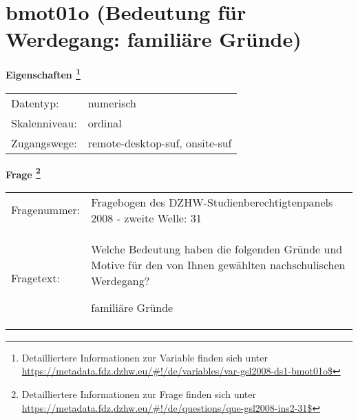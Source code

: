 
    \setcounter{footnote}{0}

    \vspace*{-1.8cm}
	\section{bmot01o (Bedeutung für Werdegang: familiäre Gründe)}
	\label{section:bmot01o}



    \vspace*{0.5cm}
    \noindent\textbf{Eigenschaften
	\footnote{Detailliertere Informationen zur Variable finden sich unter
		\url{https://metadata.fdz.dzhw.eu/\#!/de/variables/var-gsl2008-ds1-bmot01o$}}}\\
	\begin{tabularx}{\hsize}{@{}lX}
	Datentyp: & numerisch \\
	Skalenniveau: & ordinal \\
	Zugangswege: &
	  remote-desktop-suf, 
	  onsite-suf
 \\
    \end{tabularx}



				\vspace*{0.5cm}
                \noindent\textbf{Frage
	                \footnote{Detailliertere Informationen zur Frage finden sich unter
		              \url{https://metadata.fdz.dzhw.eu/\#!/de/questions/que-gsl2008-ins2-31$}}}\\
				\begin{tabularx}{\hsize}{@{}lX}
					Fragenummer: &
					  Fragebogen des DZHW-Studienberechtigtenpanels 2008 - zweite Welle:
					  31
 \\
					Fragetext: & Welche Bedeutung haben die folgenden Gründe und Motive für den von Ihnen gewählten nachschulischen Werdegang?\par  familiäre Gründe \\
				\end{tabularx}





